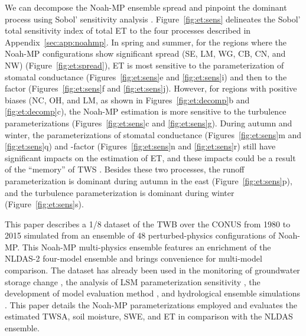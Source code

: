 \documentclass[essd, manuscript]{copernicus}
\begin{document}
We can decompose the Noah-MP ensemble spread and pinpoint the dominant process using Sobol' sensitivity analysis \citep{zheng2019WRR}. Figure~\ref{fig:et:sens} delineates the Sobol' total sensitivity index of total ET to the four processes described in Appendix~\ref{sec:app:noahmp}. In spring and summer, for the regions where the Noah-MP configurations show significant spread (SE, LM, WG, CB, CN, and NW) (Figure~\ref{fig:et:spread}), ET is most sensitive to the parameterization of stomatal conductance (Figures~\ref{fig:et:sens}e and \ref{fig:et:sens}i) and then to the \beta{} factor (Figures~\ref{fig:et:sens}f and \ref{fig:et:sens}j). However, for regions with positive biases (NC, OH, and LM, as shown in Figures~\ref{fig:et:decomp}b and \ref{fig:et:decomp}c), the Noah-MP estimation is more sensitive to the turbulence parameterizations (Figures~\ref{fig:et:sens}c and \ref{fig:et:sens}g). During autumn and winter, the parameterizations of stomatal conductance (Figures~\ref{fig:et:sens}m and \ref{fig:et:sens}q) and \beta{}-factor (Figures~\ref{fig:et:sens}n and \ref{fig:et:sens}r) still have significant impacts on the estimation of ET, and these impacts could be a result of the ``memory'' of TWS \citep{zheng2019WRR}. Besides these two processes, the runoff parameterization is dominant during autumn in the east (Figure~\ref{fig:et:sens}p), and the turbulence parameterization is dominant during winter (Figure~\ref{fig:et:sens}s).

\label{sec:availability}

\conclusions{}\label{sec:conclusions}

This paper describes a 1/8\degree{} dataset of the TWB over the CONUS from 1980 to 2015 simulated from an ensemble of 48 perturbed-physics configurations of Noah-MP\@. This Noah-MP multi-physics ensemble features an enrichment of the NLDAS-2 four-model ensemble and brings convenience for multi-model comparison. The dataset has already been used in the monitoring of groundwater storage change \citep{rateb2020WRR}, the analysis of LSM parameterization sensitivity \citep{zheng2019WRR}, the development of model evaluation method \citep{zheng2020JAMES}, and hydrological ensemble simulations \citep{fei2021WRR}. This paper details the Noah-MP parameterizations employed and evaluates the estimated TWSA, soil moisture, SWE, and ET in comparison with the NLDAS ensemble.
\end{document}
